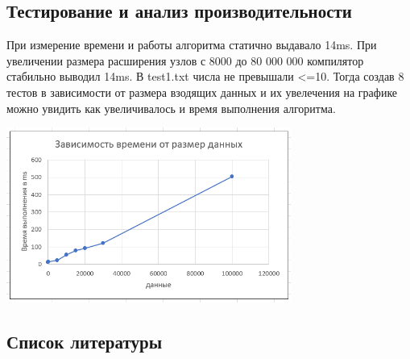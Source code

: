 \documentclass[12pt]{article}
\begin{document}
    
\newpage  
\begin{center}
   \section*{Тестирование и анализ производительности}
\end{center}
При измерение времени и работы алгоритма статично выдавало 14ms. При увеличении размера расширения узлов с 8000 до 80 000 000 компилятор стабильно выводил 14ms.
В test1.txt числа не превышали <=10. Тогда создав 8 тестов в зависимости от размера взодящих данных и их увелечения на графике можно увидить как увеличивалось и время выполнения алгоритма.
\begin{center}
        \includegraphics[width=0.7\textwidth]{img/datetime.png}
    \end{center}
\newpage  
\begin{center}
   \section*{Список литературы}
\end{center}

\nocite{*}
\printbibliography
\end{document}
